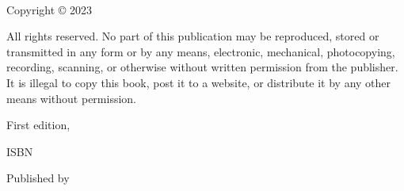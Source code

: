 
{\small
\setlength{\parindent}{0em}\setlength{\parskip}{1em}

~

\vfill

Copyright \copyright{} 2023 \authorname

All rights reserved. No part of this publication may be reproduced, stored or transmitted in any form or by any means, electronic, mechanical, photocopying, recording, scanning, or otherwise without written permission from the publisher. It is illegal to copy this book, post it to a website, or distribute it by any other means without permission.

First edition, \editionyear{}

ISBN \isbn{}  %

Published by \publisher{}
}
